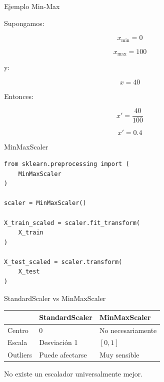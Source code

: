 \documentclass[aspectratio=169,11pt]{beamer}
\begin{document}

\begin{frame}{Ejemplo Min-Max}

Supongamos:

\[
x_{\min}=0
\]

\[
x_{\max}=100
\]

y:

\[
x=40
\]

Entonces:

\[
x'
=
\frac{
40
}{
100
}
\]

\[
\boxed{
x'=0.4
}
\]

\end{frame}


\begin{frame}[fragile]{MinMaxScaler}

\begin{lstlisting}
from sklearn.preprocessing import (
    MinMaxScaler
)

scaler = MinMaxScaler()

X_train_scaled = scaler.fit_transform(
    X_train
)

X_test_scaled = scaler.transform(
    X_test
)
\end{lstlisting}

\end{frame}


\begin{frame}{StandardScaler vs MinMaxScaler}

\begin{center}

\begin{tabular}{lll}
\toprule
 & StandardScaler & MinMaxScaler \\
\midrule

Centro &
0 &
No necesariamente \\

Escala &
Desviación 1 &
$[0,1]$ \\

Outliers &
Puede afectarse &
Muy sensible \\

\bottomrule
\end{tabular}

\end{center}

\vspace{0.5cm}

No existe un escalador universalmente mejor.

\end{frame}
\end{document}
